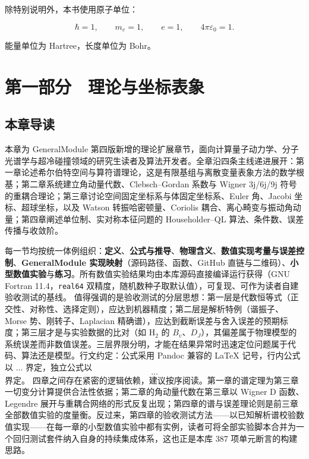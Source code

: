 \documentclass[
]{ctexbook}
\let\origsection\section
\renewcommand{\section}[1]{%
  \needspace{9\baselineskip}%
  \origsection{#1}%
}
\let\origsubsection\subsection
\renewcommand{\subsection}[1]{%
  \needspace{6\baselineskip}%
  \origsubsection{#1}%
}
\begin{document}
除特别说明外，本书使用原子单位：

\[
\hbar=1,\qquad m_e=1,\qquad e=1,\qquad 4\pi\varepsilon_0=1.
\]

能量单位为 Hartree，长度单位为 Bohr。

\hypertarget{ux7b2cux4e00ux90e8ux5206-ux7406ux8bbaux4e0eux5750ux6807ux8868ux8c61}{%
\section{第一部分　理论与坐标表象}\label{ux7b2cux4e00ux90e8ux5206-ux7406ux8bbaux4e0eux5750ux6807ux8868ux8c61}}

\hypertarget{ux672cux7ae0ux5bfcux8bfb}{%
\subsection{本章导读}\label{ux672cux7ae0ux5bfcux8bfb}}

本章为 GeneralModule
第四版新增的理论扩展章节，面向计算量子动力学、分子光谱学与超冷碰撞领域的研究生读者及算法开发者。全章沿四条主线递进展开：第一章论述希尔伯特空间与算符谱理论，这是有限基组与离散变量表象方法的数学根基；第二章系统建立角动量代数、Clebsch--Gordan
系数与 Wigner 3j/6j/9j
符号的重耦合理论；第三章讨论空间固定坐标系与体固定坐标系、Euler
角、Jacobi 坐标、超球坐标，以及 Watson 转振哈密顿量、Coriolis
耦合、离心畸变与振动角动量；第四章阐述单位制、实对称本征问题的
Householder--QL 算法、条件数、误差传播与收敛阶。

每一节均按统一体例组织：\textbf{定义}、\textbf{公式与推导}、\textbf{物理含义}、\textbf{数值实现考量与误差控制}、\textbf{GeneralModule
实现映射}（源码路径、函数、GitHub
直链与二维码）、\textbf{小型数值实验}与\textbf{练习}。所有数值实验结果均由本库源码直接编译运行获得（GNU
Fortran 11.4，\texttt{real64}
双精度，随机数种子取默认值），可复现、可作为读者自建验收测试的基线。
值得强调的是验收测试的分层思想：第一层是代数恒等式（正交性、对称性、选择定则），应达到机器精度；第二层是解析特例（谐振子、Morse
势、刚转子、Laplacian
精确谱），应达到截断误差与舍入误差的预期标度；第三层才是与实验数据的比对（如
\(\mathrm{H}_2\) 的
\(B_v\)、\(D_J\)），其偏差属于物理模型的系统误差而非数值误差。三层界限分明，才能在结果异常时迅速定位问题属于代码、算法还是模型。行文约定：公式采用
Pandoc 兼容的 LaTeX 记号，行内公式以 \(...\) 界定，独立公式以 \[...\]
界定。
四章之间存在紧密的逻辑依赖，建议按序阅读。第一章的谱定理为第三章一切变分计算提供合法性依据；第二章的角动量代数在第三章以
Wigner D 函数、Legendre
展开与重耦合网络的形式反复出现；第四章的谱与误差理论则是前三章全部数值实验的度量衡。反过来，第四章的验收测试方法------以已知解析谱校验数值实现------在每一章的小型数值实验中都有实例，读者可将全部实验脚本合并为一个回归测试套件纳入自身的持续集成体系，这也正是本库
387 项单元断言的构建思路。
\end{document}
